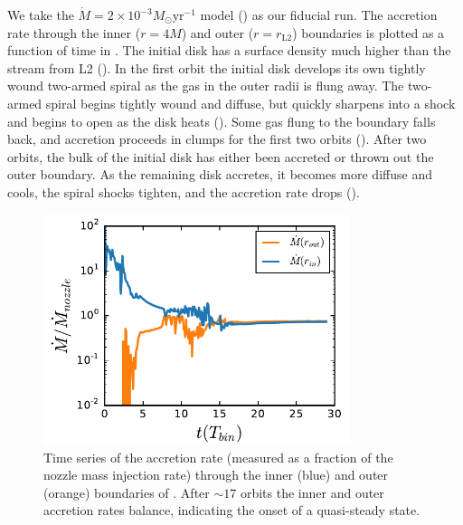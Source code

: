 We take the $\dot{M} = 2 \times 10^{-3} M_\odot \text{yr}^{-1}$ model () as our fiducial run.  The accretion rate through the inner ($r=4 M$) and outer ($r=r_\text{L2}$) boundaries is plotted as a function of time in . The initial disk has a surface density much higher than the stream from L2 ().  In the first orbit the initial disk develops its own tightly wound two-armed spiral as the gas in the outer radii is flung away.  The two-armed spiral begins tightly wound and diffuse, but quickly sharpens into a shock and begins to open as the disk heats ().  Some gas flung to the boundary falls back, and accretion proceeds in clumps for the first two orbits ().  After two orbits, the bulk of the initial disk has either been accreted or thrown out the outer boundary.  As the remaining disk accretes, it becomes more diffuse and cools, the spiral shocks tighten, and the accretion rate drops ().

\begin{figure}
\begin{center}
\includegraphics[width=0.8\textwidth]{figures/minidisk/q011_m3_mdot.pdf}
\end{center}
\caption{ Time series of the accretion rate (measured as a fraction of the nozzle mass injection rate) through the inner (blue) and outer (orange) boundaries of .  After $\sim17$ orbits the inner and outer accretion rates balance, indicating the onset of a quasi-steady state.}
\end{figure}

